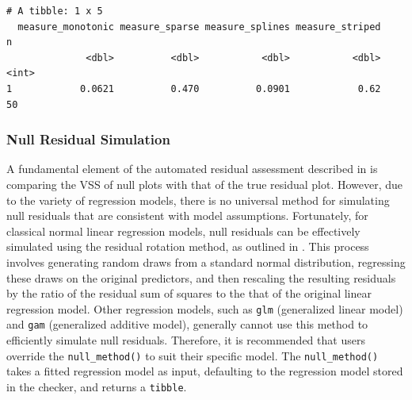 \documentclass[
doublespace,
  times]{anzsauth}
\newenvironment{Shaded}{\begin{snugshade}}{\end{snugshade}}
\newcommand{\FunctionTok}[1]{\textcolor[rgb]{0.28,0.35,0.67}{#1}}
\newcommand{\NormalTok}[1]{\textcolor[rgb]{0.00,0.23,0.31}{#1}}
\newcommand{\SpecialCharTok}[1]{\textcolor[rgb]{0.37,0.37,0.37}{#1}}
\begin{document}
\begin{Shaded}
\end{Shaded}

\begin{verbatim}
# A tibble: 1 x 5
  measure_monotonic measure_sparse measure_splines measure_striped     n
              <dbl>          <dbl>           <dbl>           <dbl> <int>
1            0.0621          0.470          0.0901            0.62    50
\end{verbatim}

\subsubsection{Null Residual Simulation}\label{sec-autovi-null-method}

A fundamental element of the automated residual assessment described in
\citet{li2024automated} is comparing the VSS of null plots with that of
the true residual plot. However, due to the variety of regression
models, there is no universal method for simulating null residuals that
are consistent with model assumptions. Fortunately, for classical normal
linear regression models, null residuals can be effectively simulated
using the residual rotation method, as outlined in
\citet{buja2009statistical}. This process involves generating random
draws from a standard normal distribution, regressing these draws on the
original predictors, and then rescaling the resulting residuals by the
ratio of the residual sum of squares to the that of the original linear
regression model. Other regression models, such as \texttt{glm}
(generalized linear model) and \texttt{gam} (generalized additive
model), generally cannot use this method to efficiently simulate null
residuals. Therefore, it is recommended that users override the
\texttt{null\_method()} to suit their specific model. The
\texttt{null\_method()} takes a fitted regression model as input,
defaulting to the regression model stored in the checker, and returns a
\texttt{tibble}.

\begin{Shaded}
\end{Shaded}
\end{document}
